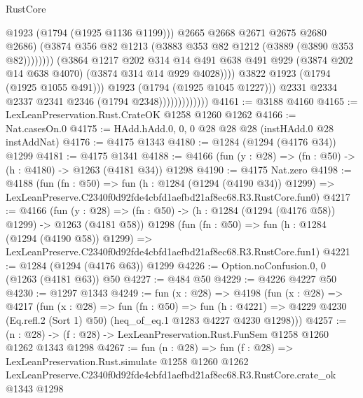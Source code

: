 \begin{lexlean}{RustCore}
\begin{coremodule}
                                                @1923
                                                (@1794 (@1925 @1136 @1199)))
                                              @2665
                                              @2668
                                              @2671
                                              @2675
                                              @2680
                                              @2686)
                                            (@3874
                                              @356
                                              @82
                                              @1213
                                              (@3883 @353 @82 @1212 (@3889 (@3890 @353 @82))))))))
                                    (@3864
                                      @1217
                                      @202
                                      @314
                                      @14
                                      @491
                                      @638
                                      @491
                                      @929
                                      (@3874 @202 @14 @638 @4070)
                                      (@3874 @314 @14 @929 @4028))))
                                @3822
                                @1923
                                (@1794 (@1925 @1055 @491)))
                              @1923
                              (@1794 (@1925 @1045 @1227)))
                            @2331
                            @2334
                            @2337
                            @2341
                            @2346
                            (@1794 @2348)))))))))))))
@4161 := @3188 @4160
@4165 := LexLeanPreservation.Rust.CrateOK @1258 @1260 @1262
@4166 := Nat.casesOn.{0}
@4175 := HAdd.hAdd.{0, 0, 0} @28 @28 @28 (instHAdd.{0} @28 instAddNat)
@4176 := @4175 @1343
@4180 := @1284 (@1294 (@4176 @34)) @1299
@4181 := @4175 @1341
@4188 := @4166 (fun (y : @28) => (fn : @50) -> (h : @4180) -> @1263 (@4181 @34)) @1298
@4190 := @4175 Nat.zero
@4198 := @4188
    (fun (fn : @50) =>
    fun (h : @1284 (@1294 (@4190 @34)) @1299) =>
    LexLeanPreserve.C2340f0d92fde4cbfd1aefbd21af8ec68.R3.RustCore.fun0)
@4217 := @4166
    (fun (y : @28) => (fn : @50) -> (h : @1284 (@1294 (@4176 @58)) @1299) -> @1263 (@4181 @58))
    @1298
    (fun (fn : @50) =>
    fun (h : @1284 (@1294 (@4190 @58)) @1299) =>
    LexLeanPreserve.C2340f0d92fde4cbfd1aefbd21af8ec68.R3.RustCore.fun1)
@4221 := @1284 (@1294 (@4176 @63)) @1299
@4226 := Option.noConfusion.{0, 0} (@1263 (@4181 @63)) @50
@4227 := @484 @50
@4229 := @4226 @4227 @50
@4230 := @1297 @1343
@4249 := fun (x : @28) =>
  @4198
    (fun (x : @28) =>
    @4217
      (fun (x : @28) =>
      fun (fn : @50) =>
      fun (h : @4221) =>
      @4229 @4230 (Eq.refl.{2} (Sort 1) @50) (heq_of_eq.{1} @1283 @4227 @4230 @1298)))
@4257 := (n : @28) -> (f : @28) -> LexLeanPreservation.Rust.FunSem @1258 @1260 @1262 @1343 @1298
@4267 := fun (n : @28) =>
  fun (f : @28) =>
  LexLeanPreservation.Rust.simulate
    @1258
    @1260
    @1262
    LexLeanPreserve.C2340f0d92fde4cbfd1aefbd21af8ec68.R3.RustCore.crate_ok
    @1343
    @1298
\end{coremodule}
\end{lexlean}
